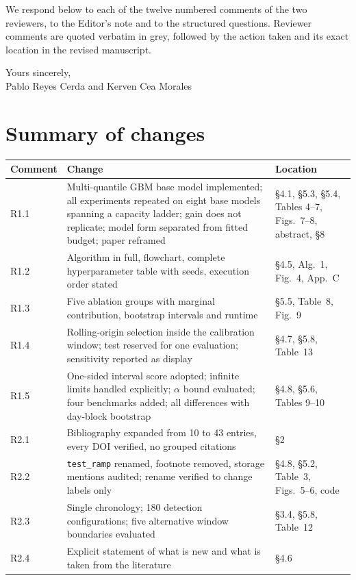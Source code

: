 \documentclass[11pt,a4paper]{article}
\begin{document}
We respond below to each of the twelve numbered comments of the two reviewers, to the Editor's note and to the structured questions. Reviewer comments are quoted verbatim in grey, followed by the action taken and its exact location in the revised manuscript.

\bigskip
Yours sincerely,\\
Pablo Reyes Cerda and Kerven Cea Morales

\clearpage
\section*{Summary of changes}

\begin{tabular}{@{}p{}p{}p{}@{}}
\toprule
Comment & Change & Location \\
\midrule
R1.1 & Multi-quantile GBM base model implemented; all experiments repeated on eight base models spanning a capacity ladder; gain does not replicate; model form separated from fitted budget; paper reframed & \S4.1, \S5.3, \S5.4, Tables 4--7, Figs.~7--8, abstract, \S8 \\
R1.2 & Algorithm in full, flowchart, complete hyperparameter table with seeds, execution order stated & \S4.5, Alg.~1, Fig.~4, App.~C \\
R1.3 & Five ablation groups with marginal contribution, bootstrap intervals and runtime & \S5.5, Table~8, Fig.~9 \\
R1.4 & Rolling-origin selection inside the calibration window; test reserved for one evaluation; sensitivity reported as display & \S4.7, \S5.8, Table~13 \\
R1.5 & One-sided interval score adopted; infinite limits handled explicitly; $\alpha$ bound evaluated; four benchmarks added; all differences with day-block bootstrap & \S4.8, \S5.6, Tables 9--10 \\
R2.1 & Bibliography expanded from 10 to 43 entries, every DOI verified, no grouped citations & \S2 \\
R2.2 & \texttt{test\_ramp} renamed, footnote removed, storage mentions audited; rename verified to change labels only & \S4.8, \S5.2, Table~3, Figs.~5--6, code \\
R2.3 & Single chronology; 180 detection configurations; five alternative window boundaries evaluated & \S3.4, \S5.8, Table~12 \\
R2.4 & Explicit statement of what is new and what is taken from the literature & \S4.6 \\

\end{tabular}
\end{document}
